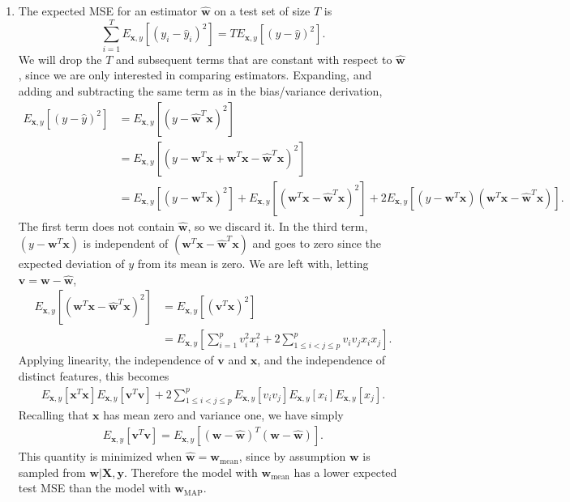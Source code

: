\documentclass[submit]{harvardml}
\begin{document}
\begin{enumerate}
	\item The expected MSE for an estimator $\hat{\textbf{w}}$ on a test set of size $T$ is
	$$\sum_{i=1}^T E_{\mathbf{x}, y}[(y_i - \hat{y}_i)^2] = TE_{\mathbf{x}, y}[(y - \hat{y})^2].$$
	We will drop the $T$ and subsequent terms that are constant with respect to $\hat{\textbf{w}}$, since we are only interested in comparing estimators. Expanding, and adding and subtracting the same term as in the bias/variance derivation,
	\begin{align*}
		E_{\mathbf{x}, y}[(y - \hat{y})^2] &= E_{\mathbf{x}, y}[(y - \hat{\textbf{w}}^T\mathbf{x})^2] \\
		&= E_{\mathbf{x}, y}[(y - \mathbf{w}^T\textbf{x} + \mathbf{w}^T\textbf{x} - \hat{\mathbf{w}}^T\mathbf{x})^2] \\
		&= E_{\mathbf{x}, y}[(y - \mathbf{w}^T\textbf{x})^2] + E_{\mathbf{x}, y}[(\mathbf{w}^T\textbf{x} - \hat{\mathbf{w}}^T\mathbf{x})^2] + 2E_{\mathbf{x}, y}[(y - \mathbf{w}^T\textbf{x}) (\mathbf{w}^T\textbf{x} - \hat{\mathbf{w}}^T\mathbf{x})].
	\end{align*}
	The first term does not contain $\hat{\textbf{w}}$, so we discard it. In the third term, $(y - \mathbf{w}^T\textbf{x})$ is independent of $(\mathbf{w}^T\textbf{x} - \hat{\mathbf{w}}^T\mathbf{x})$ and goes to zero since the expected deviation of $y$ from its mean is zero. We are left with, letting $\mathbf{v} = \mathbf{w} - \hat{\mathbf{w}}$,
	\begin{align*}
		E_{\mathbf{x}, y}[(\mathbf{w}^T\textbf{x} - \hat{\mathbf{w}}^T\mathbf{x})^2]
		&= E_{\mathbf{x}, y}[({\mathbf{v}}^T\mathbf{x})^2] \\
		&= E_{\mathbf{x}, y}\left[\sum_{i=1}^p v_i^2x_i^2 + 2 \sum_{1 \leq i < j \leq p}^p v_iv_jx_ix_j\right].
	\end{align*}
	Applying linearity, the independence of $\mathbf{v}$ and $\mathbf{x}$, and the independence of distinct features, this becomes
	\begin{align*}
		E_{\mathbf{x}, y}[\mathbf{x}^T\mathbf{x}]E_{\mathbf{x}, y}[\mathbf{v}^T\mathbf{v}] + 2 \sum_{1 \leq i < j \leq p}^p E_{\mathbf{x}, y}[v_iv_j]E_{\mathbf{x}, y}[x_i]E_{\mathbf{x}, y}[x_j].
	\end{align*}
	Recalling that $\mathbf{x}$ has mean zero and variance one, we have simply
	\begin{align*}
		E_{\mathbf{x}, y}[\mathbf{v}^T\mathbf{v}] = E_{\mathbf{x}, y}[(\mathbf{w} - \hat{\mathbf{w}})^T(\mathbf{w} - \hat{\mathbf{w}})].
	\end{align*}
	This quantity is minimized when $\hat{\mathbf{w}} = \mathbf{w}_{\mathrm{mean}}$, since by assumption $\mathbf{w}$ is sampled from $\mathbf{w}|\mathbf{X},\mathbf{y}$. Therefore the model with $\mathbf{w}_{\mathrm{mean}}$ has a lower expected test MSE than the model with $\mathbf{w}_{\mathrm{MAP}}$.
	
\end{enumerate}
\end{document}
